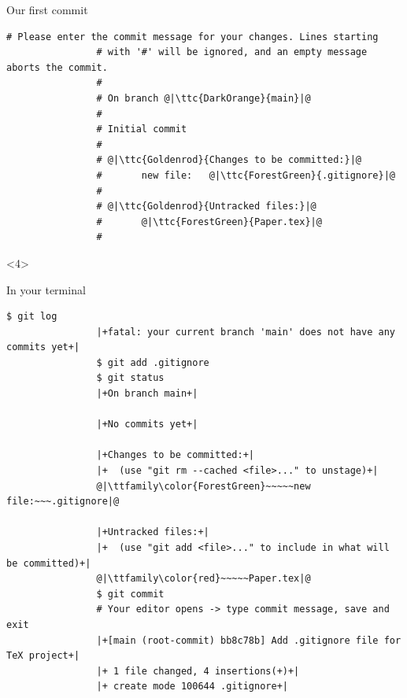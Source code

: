 \documentclass[usenames,svgnames,14pt]{beamer}
\newcommand{\ttc}[2]{\texttt{\textcolor{#1}{#2}}}
\begin{document}
\begin{frame}[fragile]{Our first commit}
\begin{overlayarea}{\textwidth}{0.7\textheight}
\begin{onlyenv}
\begin{lstlisting}[style=MyBash, aboveskip=2mm, xleftmargin=-3mm, xrightmargin=-3mm]
                # Please enter the commit message for your changes. Lines starting
                # with '#' will be ignored, and an empty message aborts the commit.
                #
                # On branch @|\ttc{DarkOrange}{main}|@
                #
                # Initial commit
                #
                # @|\ttc{Goldenrod}{Changes to be committed:}|@
                #       new file:   @|\ttc{ForestGreen}{.gitignore}|@
                #
                # @|\ttc{Goldenrod}{Untracked files:}|@
                #       @|\ttc{ForestGreen}{Paper.tex}|@
                #
            \end{lstlisting}
        \end{onlyenv}
        \begin{onlyenv}<4>
            \centerline{In your terminal}
            \begin{lstlisting}[style=MyBash, aboveskip=2mm, xleftmargin=-2mm, xrightmargin=-2mm]
                $ git log
                |+fatal: your current branch 'main' does not have any commits yet+|
                $ git add .gitignore
                $ git status
                |+On branch main+|

                |+No commits yet+|

                |+Changes to be committed:+|
                |+  (use "git rm --cached <file>..." to unstage)+|
                @|\ttfamily\color{ForestGreen}~~~~~new file:~~~.gitignore|@

                |+Untracked files:+|
                |+  (use "git add <file>..." to include in what will be committed)+|
                @|\ttfamily\color{red}~~~~~Paper.tex|@
                $ git commit
                # Your editor opens -> type commit message, save and exit
                |+[main (root-commit) bb8c78b] Add .gitignore file for TeX project+|
                |+ 1 file changed, 4 insertions(+)+|
                |+ create mode 100644 .gitignore+|
            \end{lstlisting}
        \end{onlyenv}
    \end{overlayarea}
\end{frame}
\end{document}
